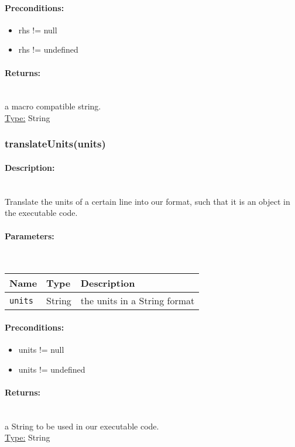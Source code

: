 \paragraph{Preconditions:} 
\begin{itemize}  
\item  rhs != null
\item  rhs != undefined
\end{itemize}  
\paragraph{Returns:} \hfill \\ 
a macro compatible string.\\ 
\underline{Type:} String
\subsubsection{translateUnits(units)} 
\paragraph{Description:} \hfill \\ 
Translate the units of a certain line into our format, such
that it is an object in the executable code.
\paragraph{Parameters:} \hfill \\ 
\begin{tabular}{|l|l|l|}
\hline
\textbf{Name} & \textbf{Type} & \textbf{Description} \\ 
\hline
\texttt{units} & String & the units in a String format\\ 
\hline
\end{tabular}
\paragraph{Preconditions:} 
\begin{itemize}  
\item  units != null
\item  units != undefined
\end{itemize}  
\paragraph{Returns:} \hfill \\ 
a String to be used in our executable code.\\ 
\underline{Type:} String
